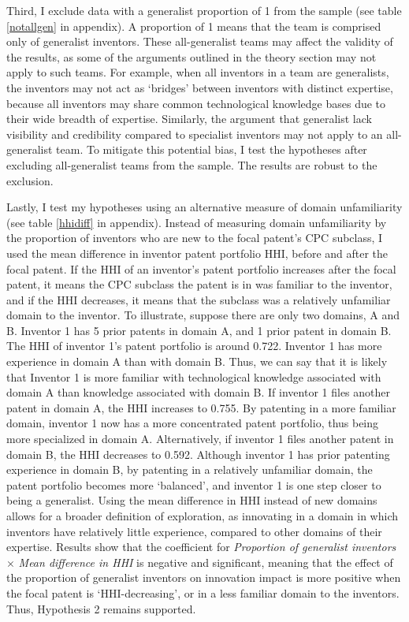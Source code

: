 \documentclass{article}
\begin{document}
Third, I exclude data with a generalist proportion of 1 from the sample (see table \ref{notallgen} in appendix). A proportion of 1 means that the team is comprised only of generalist inventors. These all-generalist teams may affect the validity of the results, as some of the arguments outlined in the theory section may not apply to such teams. For example, when all inventors in a team are generalists, the inventors may not act as `bridges' between inventors with distinct expertise, because all inventors may share common technological knowledge bases due to their wide breadth of expertise. Similarly, the argument that generalist lack visibility and credibility compared to specialist inventors may not apply to an all-generalist team. To mitigate this potential bias, I test the hypotheses after excluding all-generalist teams from the sample. The results are robust to the exclusion.

Lastly, I test my hypotheses using an alternative measure of domain unfamiliarity (see table \ref{hhidiff} in appendix). Instead of measuring domain unfamiliarity by the proportion of inventors who are new to the focal patent's CPC subclass, I used the mean difference in inventor patent portfolio HHI, before and after the focal patent. If the HHI of an inventor's patent portfolio increases after the focal patent, it means the CPC subclass the patent is in was familiar to the inventor, and if the HHI decreases, it means that the subclass was a relatively unfamiliar domain to the inventor. To illustrate, suppose there are only two domains, A and B. Inventor 1 has 5 prior patents in domain A, and 1 prior patent in domain B. The HHI of inventor 1's patent portfolio is around 0.722. Inventor 1 has more experience in domain A than with domain B. Thus, we can say that it is likely that Inventor 1 is more familiar with technological knowledge associated with domain A than knowledge associated with domain B. If inventor 1 files another patent in domain A, the HHI increases to 0.755. By patenting in a more familiar domain, inventor 1 now has a more concentrated patent portfolio, thus being more specialized in domain A. Alternatively, if inventor 1 files another patent in domain B, the HHI decreases to 0.592. Although inventor 1 has prior patenting experience in domain B, by patenting in a relatively unfamiliar domain, the patent portfolio becomes more `balanced', and inventor 1 is one step closer to being a generalist. Using the mean difference in HHI instead of new domains allows for a broader definition of exploration, as innovating in a domain in which inventors have relatively little experience, compared to other domains of their expertise. Results show that the coefficient for \textit{Proportion of generalist inventors} $\times$ \textit{Mean difference in HHI} is negative and significant, meaning that the effect of the proportion of generalist inventors on innovation impact is more positive when the focal patent is `HHI-decreasing', or in a less familiar domain to the inventors. Thus, Hypothesis 2 remains supported.
\end{document}
